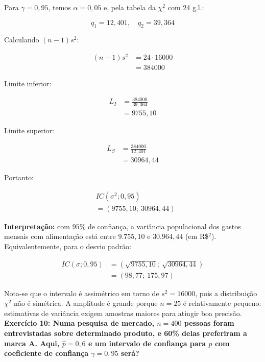 \documentclass[8pt, a4paper, landscape]{extarticle}
\begin{document}
\begin{multicols}{6}
Para $\gamma = 0,95$, temos $\alpha = 0,05$ e, pela tabela da $\chi^2$ com 24 g.l.:

\begin{equation*}
q_1 = 12,401, \quad q_2 = 39,364
\end{equation*}

Calculando $(n-1)s^2$:

\begin{equation*}
\begin{split}
(n-1)s^2 &= 24 \cdot 16000 \\
&= 384000
\end{split}
\end{equation*}

Limite inferior:

\begin{equation*}
\begin{split}
L_I &= \frac{384000}{39,364} \\
&= 9755,10
\end{split}
\end{equation*}

Limite superior:

\begin{equation*}
\begin{split}
L_S &= \frac{384000}{12,401} \\
&= 30964,44
\end{split}
\end{equation*}

Portanto:

\begin{equation*}
\begin{split}
&IC(\sigma^2;0,95) \\
&= (9755,10;\ 30964,44)
\end{split}
\end{equation*}

\textbf{Interpretação:} com $95\%$ de confiança, a variância populacional dos gastos mensais com alimentação está entre $9.755,10$ e $30.964,44$ (em R\$$^2$). Equivalentemente, para o desvio padrão:

\begin{equation*}
\begin{split}
IC(\sigma;0,95) &= (\sqrt{9755,10};\ \sqrt{30964,44}) \\
&= (98,77;\ 175,97)
\end{split}
\end{equation*}

Nota-se que o intervalo é assimétrico em torno de $s^2 = 16000$, pois a distribuição $\chi^2$ não é simétrica. A amplitude é grande porque $n = 25$ é relativamente pequeno: estimativas de variância exigem amostras maiores para atingir boa precisão.
\textbf{Exercício 10: Numa pesquisa de mercado, $n = 400$ pessoas foram entrevistadas sobre determinado produto, e 60\% delas preferiram a marca A. Aqui, $\hat{p} = 0,6$ e um intervalo de confiança para $p$ com coeficiente de confiança $\gamma = 0,95$ será?}


\end{multicols}
\end{document}
